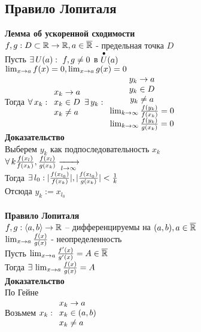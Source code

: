 \documentclass[12pt]{article}
\begin{document}
\subsection{Правило Лопиталя}
\textbf{Лемма об ускоренной сходимости}\\
$f, g: D \subset \mathbb{R} \rightarrow \mathbb{R}, a\in \overline{\mathbb{R}}$ - предельная точка $D$\\
Пусть $\exists\, U(a):\ f,g\neq 0$ в $\overset{\bullet}{U}(a)$\\
$\lim_{x\rightarrow a} f(x) = 0, \lim_{x\rightarrow a} g(x) = 0$\\
Тогда $\forall\, x_k: \begin{array}{l}
     x_k \rightarrow a\\
     x_k \in D\\
     x_k \neq a
\end{array} \exists\, y_k: \begin{array}{cc}
     y_k \rightarrow a\\
     y_k \in D\\
     y_k \neq a\\
     \lim_{k \rightarrow \infty} \frac{f(y_k)}{f(x_k)} = 0\\
     \lim_{k \rightarrow \infty} \frac{f(y_k)}{g(x_k)} = 0
\end{array}$\\
\textbf{Доказательство}\\
Выберем $y_k$ как подпоследовательность $x_k$\\
$\forall\, k \frac{f(x_l)}{f(x_k)},\frac{f(x_l)}{g(x_k)} \xrightarrow[l\rightarrow \infty]{}$\\
Тогда $\exists\, l_0: |\frac{f(x_{l_0})}{f(x_k)}|,|\frac{f(x_{l_0})}{g(x_k)}| < \frac1k$\\
Отсюда $y_k := x_{l_0}$\\\\
\textbf{Правило Лопиталя}\\
$f,g: \langle a, b \rangle \rightarrow \mathbb{R}$ -- дифференцируемы на $(a,b), a \in \overline{\mathbb{R}}$\\
$\lim_{x\rightarrow a} \frac{f(x)}{g(x)}$ - неопределенность\\
Пусть $\lim_{x\rightarrow a}\frac{f'(x)}{g'(x)} = A \in \overline{\mathbb{R}}$\\
Тогда $\exists\, \lim_{x\rightarrow a} \frac{f(x)}{g(x)} = A$\\
\textbf{Доказательство}\\
По Гейне\\
Возьмем $x_k: \begin{array}{l}
     x_k \rightarrow a\\
     x_k \in (a, b)\\
     x_k \neq a
\end{array}$\\
\end{document}
